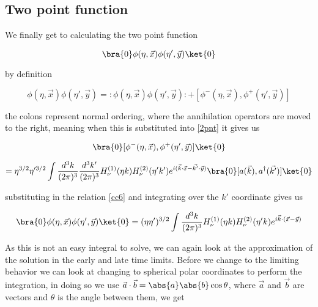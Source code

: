 \documentclass[a4paper,11pt]{article}
\numberwithin{equation}{section}
\numberwithin{figure}{section}
\begin{document}
\begin{large}
\newpage

\subsection{Two point function}

We finally get to calculating the two point function

\begin{equation}
\label{2pnt}    
    \bra{0}\phi(\eta,\Vec{x})\phi(\eta',\Vec{y})\ket{0}
\end{equation}

by definition 

\begin{equation}
\label{normalorder and com}    
    \phi(\eta,\Vec{x})\phi(\eta',\Vec{y})=:\phi(\eta,\Vec{x})\phi(\eta',\Vec{y}):+[\phi^-(\eta,\Vec{x}),\phi^+(\eta',\Vec{y})]
\end{equation}

the colons represent normal ordering, where the annihilation operators are moved to the right, meaning when this is substituted into \eqref{2pnt} it gives us

\begin{equation}
\label{2point}    
    \bra{0}[\phi^-(\eta,\Vec{x}),\phi^+(\eta',\Vec{y})]\ket{0}
\end{equation}

\begin{equation}
\label{2pointcalc}
    =\eta^{3/2}\eta'^{3/2}\int \frac{d^3k}{(2\pi)^3}\frac{d^3k'}{(2\pi)^3}H^{(1)}_\nu(\eta k)H^{(2)}_\nu(\eta'k')e^{i(\Vec{k}\cdot\Vec{x}-\Vec{k'}\cdot\Vec{y})}\bra{0}[a(\Vec{k}),a^\dagger(\Vec{k'})]\ket{0}
\end{equation}

substituting in the relation \eqref{cc6} and integrating over the $k'$ coordinate gives us

\begin{equation}
\label{2pointsol}    
    \bra{0} \phi(\eta,\Vec{x})\phi(\eta',\Vec{y})\ket{0}=(\eta\eta')^{3/2}\int \frac{d^3k}{(2\pi)^3}H^{(1)}_\nu(\eta k)H^{(2)}_\nu(\eta'k)e^{i\Vec{k}\cdot(\Vec{x}-\Vec{y})}
\end{equation}

As this is not an easy integral to solve, we can again look at the approximation of the solution in the early and late time limits. Before we change to the limiting behavior we can look at changing to spherical polar coordinates to perform the integration, in doing so we use $\Vec{a}\cdot\Vec{b}=\abs{a}\abs{b}\cos \theta$, where $\Vec{a}$ and $\Vec{b}$ are vectors and $\theta$ is the angle between them, we get


\end{large}
\end{document}
